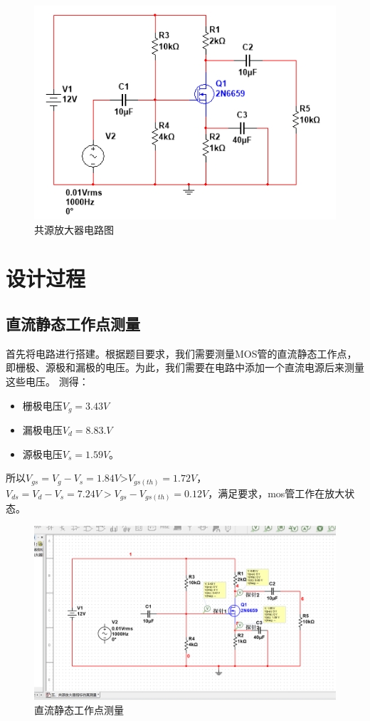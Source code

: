 \documentclass[12p,UTF8]{article}
\begin{document}
\begin{spacing}{1.25}
\begin{figure}[h]
  \centering
  \includegraphics[width=1\linewidth]{timu.png}
  \caption{共源放大器电路图}
  \label{fig:circuit}
\end{figure}

\section{设计过程}

\subsection{直流静态工作点测量}
首先将电路进行搭建。根据题目要求，我们需要测量MOS管的直流静态工作点，即栅极、源极和漏极的电压。为此，我们需要在电路中添加一个直流电源后来测量这些电压。
测得：
\begin{itemize}
  \item 栅极电压$V_g=3.43V$
  \item 漏极电压$V_d=8.83.V$
  \item 源极电压$V_s=1.59V$。
\end{itemize}
所以$V_{gs}=V_g-V_s=1.84V$>$V_{gs(th)}=1.72V$，\\
$V_{ds}=V_d-V_s=7.24V>V_{gs}-V_{gs(th)}=0.12V$，满足要求，mos管工作在放大状态。
\begin{figure}[h]
  \centering
  \includegraphics[width=1\linewidth]{1.png}
  \caption{直流静态工作点测量}
  \label{fig:circuit}
\end{figure}


\end{spacing}
\end{document}
